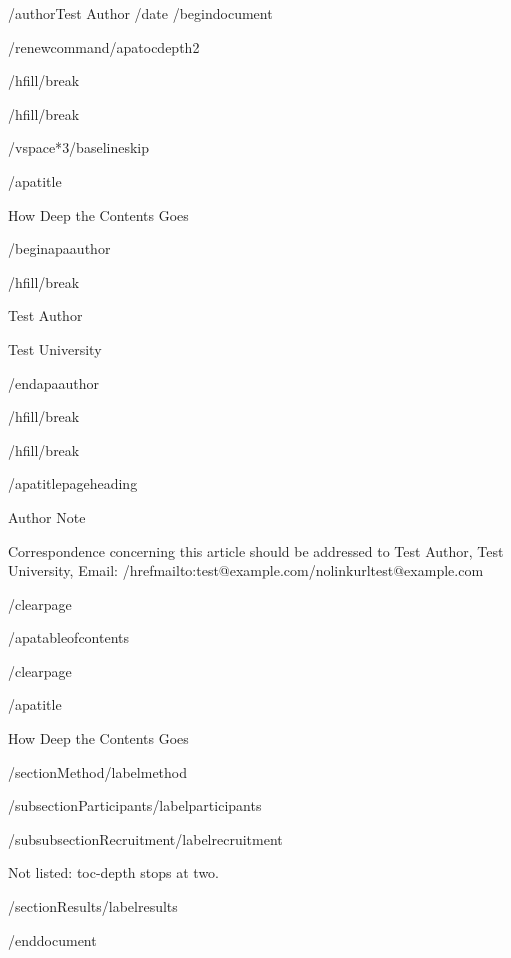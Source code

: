 /author{Test Author}
/date{}
/begin{document}


/renewcommand{/apatocdepth}{2}

/hfill/break

/hfill/break

/vspace*{3/baselineskip}

/apatitle{

How Deep the Contents Goes

}

/begin{apaauthor}

/hfill/break

Test Author

Test University

/end{apaauthor}

/hfill/break

/hfill/break

/apatitlepageheading{

Author Note

}

Correspondence concerning this article should be addressed to Test
Author, Test University, Email:
/href{mailto:test@example.com}{/nolinkurl{test@example.com}}

/clearpage

/apatableofcontents

/clearpage

/apatitle{

How Deep the Contents Goes

}

/section{Method}/label{method}

/subsection{Participants}/label{participants}

/subsubsection{Recruitment}/label{recruitment}

Not listed: toc-depth stops at two.

/section{Results}/label{results}




/end{document}

